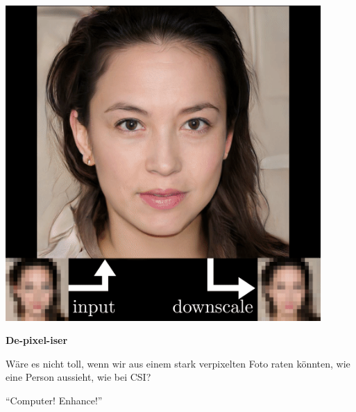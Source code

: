 \documentclass[aspectratio=169,usenames,dvipsnames]{beamer}
\begin{document}
\begin{frame}
\begin{minipage}{.5\textwidth}
\includegraphics[width=0.9\textwidth, keepaspectratio]{images/step12}
\end{minipage}\begin{minipage}{.5\textwidth}
\textbf{De-pixel-iser}
\bigskip

Wäre es nicht toll, wenn wir aus einem stark verpixelten Foto raten könnten, wie eine Person aussieht, wie bei CSI?
\bigskip

``Computer! Enhance!''
\end{minipage}
\end{frame}
\end{document}
